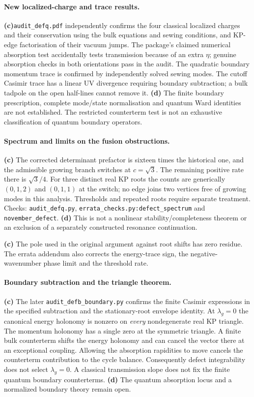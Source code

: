 \documentclass[11pt,a4paper]{article}
\newcommand{\Lc}{\textsf{\textbf{(c)}}\xspace}
\newcommand{\Ld}{\textsf{\textbf{(d)}}\xspace}
\newcommand{\file}[1]{\nolinkurl{#1}}
\theoremstyle{remark}\newtheorem{remark}[proposition]{Remark}
\begin{document}
\paragraph{New localized-charge and trace results.}
\Lc \file{audit_defq.pdf} independently confirms the four classical localized
charges and their conservation using the bulk equations and sewing conditions,
and KP-edge factorisation of their vacuum jumps. The package's claimed
numerical absorption test accidentally tests transmission because of an extra
$\eta$; genuine absorption checks in both orientations pass in the audit.
The quadratic boundary momentum trace is confirmed by independently solved
sewing modes. The cutoff Casimir trace has a linear UV divergence requiring
boundary subtraction; a bulk tadpole on the open half-lines cannot remove it.
\Ld The finite boundary prescription, complete mode/state normalisation and
quantum Ward identities are not established. The restricted counterterm test
is not an exhaustive classification of quantum boundary operators.

\paragraph{Spectrum and limits on the fusion obstructions.}
\Lc The corrected determinant prefactor is sixteen times the historical one,
and the admissible growing branch switches at $c=\sqrt3$. The remaining
positive rate there is $\sqrt3/4$. For three distinct real KP roots the
counts are generically $(0,1,2)$ and $(0,1,1)$ at the switch; no edge joins
two vertices free of growing modes in this analysis. Thresholds and repeated
roots require separate treatment. Checks: \file{audit_defq.py},
\file{errata_checks.py:defect_spectrum} and \file{november_defect}.
\Ld This is not a nonlinear stability/completeness theorem or an exclusion of
a separately constructed resonance continuation.

\Lc The pole used in the original argument against root shifts has zero
residue. The errata addendum also corrects the energy-trace sign, the
negative-wavenumber phase limit and the threshold rate.

\paragraph{Boundary subtraction and the triangle theorem.}
\Lc The later \file{audit_defb_boundary.py} confirms the finite Casimir
expressions in the specified subtraction and the stationary-root envelope
identity. At $\lambda_g=0$ the canonical energy holonomy is nonzero on
\emph{every} nondegenerate real KP triangle. The momentum holonomy has a
single zero at the symmetric triangle. A finite bulk counterterm shifts
the energy holonomy and can cancel the vector there at an exceptional
coupling. Allowing the absorption rapidities to move cancels the
counterterm contribution to the cycle balance. Consequently defect
integrability does not select $\lambda_g=0$. A classical transmission
slope does not fix the finite quantum boundary counterterms. \Ld The
quantum absorption locus and a normalized boundary theory remain open.
\end{document}
